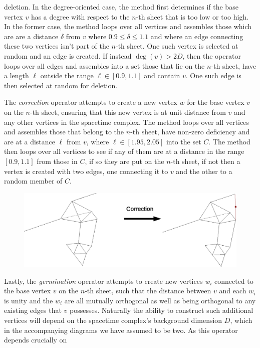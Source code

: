 \documentclass[12pt,letterpaper]{report}
\begin{document}
deletion. In the degree-oriented case, the method first determines if the base vertex $v$ has a degree with 
respect to the $n$-th sheet that is too low or too high. In the former case, the method loops over all vertices 
and assembles those which are are a distance $\delta$ from $v$ where $0.9 \le \delta \le 1.1$ and where an 
edge connecting these two vertices isn't part of the $n$-th sheet. One such vertex is selected at random and 
an edge is created. If instead $\deg(v) > 2D$, then the operator loops over all edges and assembles into a set 
those that lie on the $n$-th sheet, have a length $\ell$ outside the range $\ell \in [0.9,1.1]$ and contain 
$v$. One such edge is then selected at random for deletion.    

The \emph{correction} operator attempts to create a new vertex $w$ for the base vertex $v$ on the $n$-th 
sheet, ensuring that this new vertex is at unit distance from $v$ and any other vertices in the spacetime 
complex. The method loops over all vertices and assembles those that belong to the $n$-th sheet, have non-zero 
deficiency and are at a distance $\ell$ from $v$, where $\ell\in [1.95,2.05]$ into the set $C$. The method 
then loops over all vertices to see if any of them are at a distance in the range $[0.9,1.1]$ from those in 
$C$, if so they are put on the $n$-th sheet, if not then a vertex is created with two edges, one connecting 
it to $v$ and the other to a random member of $C$.  
\begin{figure}[htp]
\centering
\label{expl_final1}
\includegraphics[width=5in]{images/correction.eps} 
\end{figure}
Lastly, the \emph{germination} operator attempts to create new vertices $w_i$ connected to the base vertex 
$v$ on the $n$-th sheet, such that the distance between $v$ and each $w_i$ is unity and the $w_i$ are all 
mutually orthogonal as well as being orthogonal to any existing edges that $v$ possesses. Naturally the 
ability to construct such additional vertices will depend on the spacetime complex's background dimension 
$D$, which in the accompanying diagrams we have assumed to be two. As this operator depends crucially on 
\end{document}
